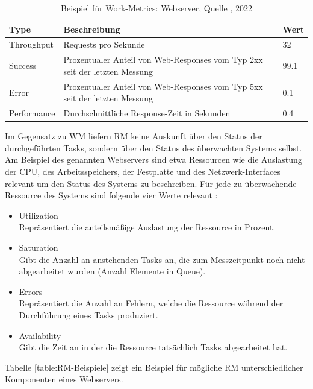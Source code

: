 \bigbreak
\begin{table}[H]
    \centering
    \caption{Beispiel für Work-Metrics: Webserver, Quelle \textcite{le-quoc_2015}, 2022} 
    \tiny
        \begin{tabular}{lll}
            \hline
            Type & Beschreibung & Wert\\
            \hline\hline
            Throughput & Requests pro Sekunde & 32\\
            Success & Prozentualer Anteil von Web-Responses vom Typ 2xx seit der letzten Messung & 99.1\\
            Error & Prozentualer Anteil von Web-Responses vom Typ 5xx seit der letzten Messung & 0.1\\
            Performance & Durchschnittliche Response-Zeit in Sekunden & 0.4\\
        \end{tabular}
        \label{table:WM-Beispiele}
\end{table}
\bigbreak
Im Gegensatz zu WM liefern RM keine Auskunft über den Status der durchgeführten Tasks, sondern über den Status des überwachten Systems selbst. Am Beispiel des genannten Webservers sind etwa Ressourcen wie die Auslastung der CPU, des Arbeitsspeichers, der Festplatte und des Netzwerk-Interfaces relevant um den Status des Systems zu beschreiben.
\bigbreak
Für jede zu überwachende Ressource des Systems sind folgende vier Werte relevant \autocite{le-quoc_2015}:
\begin{itemize}
    \item Utilization\\
    Repräsentiert die anteilsmäßige Auslastung der Ressource in Prozent.
    \item Saturation\\
    Gibt die Anzahl an anstehenden Tasks an, die zum Messzeitpunkt noch nicht abgearbeitet wurden (Anzahl Elemente in Queue).
    \item Errors\\
    Repräsentiert die Anzahl an Fehlern, welche die Ressource während der Durchführung eines Tasks produziert.
    \item Availability\\
    Gibt die Zeit an in der die Ressource tatsächlich Tasks abgearbeitet hat. 
\end{itemize}
\bigbreak
Tabelle \ref{table:RM-Beispiele} zeigt ein Beispiel für mögliche RM unterschiedlicher Komponenten eines Webservers. 
\bigbreak
